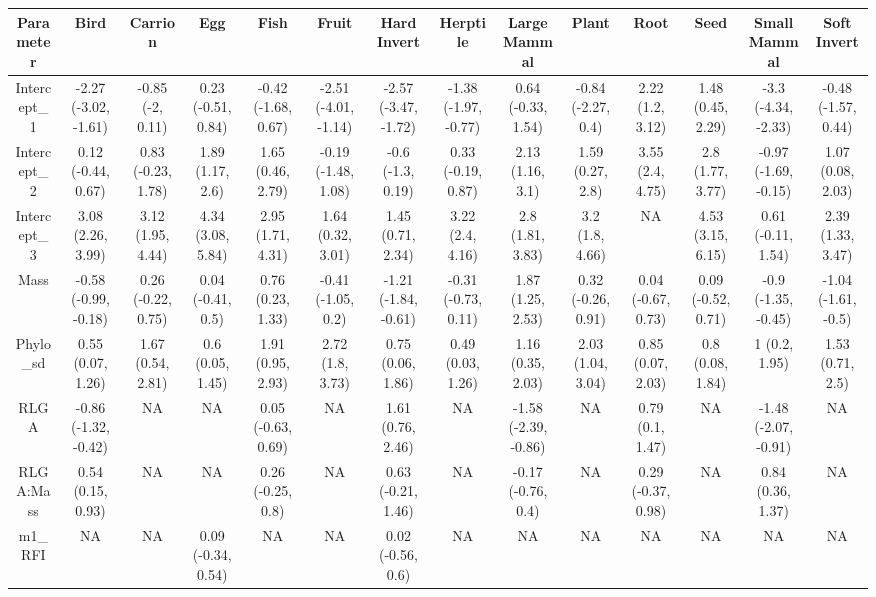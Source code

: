 \begin{table}
\centering\begingroup\fontsize{10}{12}\selectfont

\begin{tabular}[t]{c|c|c|c|c|c|c|c|c|c|c|c|c|c}
\hline
Parameter & Bird & Carrion & Egg & Fish & Fruit & Hard Invert & Herptile & Large Mammal & Plant & Root & Seed & Small Mammal & Soft Invert\\
\hline
Intercept_1 & -2.27 (-3.02, -1.61) & -0.85 (-2, 0.11) & 0.23 (-0.51, 0.84) & -0.42 (-1.68, 0.67) & -2.51 (-4.01, -1.14) & -2.57 (-3.47, -1.72) & -1.38 (-1.97, -0.77) & 0.64 (-0.33, 1.54) & -0.84 (-2.27, 0.4) & 2.22 (1.2, 3.12) & 1.48 (0.45, 2.29) & -3.3 (-4.34, -2.33) & -0.48 (-1.57, 0.44)\\
\hline
Intercept_2 & 0.12 (-0.44, 0.67) & 0.83 (-0.23, 1.78) & 1.89 (1.17, 2.6) & 1.65 (0.46, 2.79) & -0.19 (-1.48, 1.08) & -0.6 (-1.3, 0.19) & 0.33 (-0.19, 0.87) & 2.13 (1.16, 3.1) & 1.59 (0.27, 2.8) & 3.55 (2.4, 4.75) & 2.8 (1.77, 3.77) & -0.97 (-1.69, -0.15) & 1.07 (0.08, 2.03)\\
\hline
Intercept_3 & 3.08 (2.26, 3.99) & 3.12 (1.95, 4.44) & 4.34 (3.08, 5.84) & 2.95 (1.71, 4.31) & 1.64 (0.32, 3.01) & 1.45 (0.71, 2.34) & 3.22 (2.4, 4.16) & 2.8 (1.81, 3.83) & 3.2 (1.8, 4.66) & NA & 4.53 (3.15, 6.15) & 0.61 (-0.11, 1.54) & 2.39 (1.33, 3.47)\\
\hline
Mass & -0.58 (-0.99, -0.18) & 0.26 (-0.22, 0.75) & 0.04 (-0.41, 0.5) & 0.76 (0.23, 1.33) & -0.41 (-1.05, 0.2) & -1.21 (-1.84, -0.61) & -0.31 (-0.73, 0.11) & 1.87 (1.25, 2.53) & 0.32 (-0.26, 0.91) & 0.04 (-0.67, 0.73) & 0.09 (-0.52, 0.71) & -0.9 (-1.35, -0.45) & -1.04 (-1.61, -0.5)\\
\hline
Phylo_sd & 0.55 (0.07, 1.26) & 1.67 (0.54, 2.81) & 0.6 (0.05, 1.45) & 1.91 (0.95, 2.93) & 2.72 (1.8, 3.73) & 0.75 (0.06, 1.86) & 0.49 (0.03, 1.26) & 1.16 (0.35, 2.03) & 2.03 (1.04, 3.04) & 0.85 (0.07, 2.03) & 0.8 (0.08, 1.84) & 1 (0.2, 1.95) & 1.53 (0.71, 2.5)\\
\hline
RLGA & -0.86 (-1.32, -0.42) & NA & NA & 0.05 (-0.63, 0.69) & NA & 1.61 (0.76, 2.46) & NA & -1.58 (-2.39, -0.86) & NA & 0.79 (0.1, 1.47) & NA & -1.48 (-2.07, -0.91) & NA\\
\hline
RLGA:Mass & 0.54 (0.15, 0.93) & NA & NA & 0.26 (-0.25, 0.8) & NA & 0.63 (-0.21, 1.46) & NA & -0.17 (-0.76, 0.4) & NA & 0.29 (-0.37, 0.98) & NA & 0.84 (0.36, 1.37) & NA\\
\hline
m1_RFI & NA & NA & 0.09 (-0.34, 0.54) & NA & NA & 0.02 (-0.56, 0.6) & NA & NA & NA & NA & NA & NA & NA\\

\end{tabular}
\end{table}

